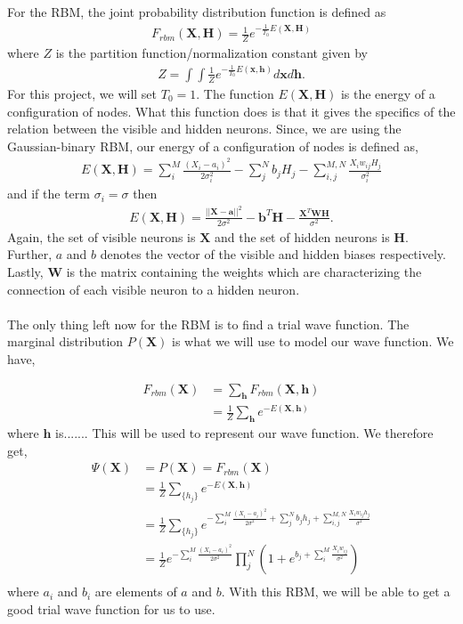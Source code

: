 For the RBM, the joint probability distribution function is defined as 
\begin{align*}
	F_{rbm}(\mathbf{X},\mathbf{H}) = \frac{1}{Z} e^{-\frac{1}{T_0}E(\mathbf{X},\mathbf{H})}
\end{align*}
where $Z$ is the partition function/normalization constant given by
\begin{align*}
	Z = \int \int \frac{1}{Z} e^{-\frac{1}{T_0}E(\mathbf{x},\mathbf{h})} d\mathbf{x} d\mathbf{h}.
\end{align*}
For this project, we will set $T_0 = 1$. The function $E(\mathbf{X},\mathbf{H})$ is the energy of a configuration of nodes. What this function does is that it gives the specifics of the relation between the visible and hidden neurons. Since, we are using the Gaussian-binary RBM, our energy of a configuration of nodes is defined as, 
\begin{align*}
	E(\mathbf{X}, \mathbf{H}) = \sum_i^M \frac{(X_i - a_i)^2}{2\sigma_i^2} - \sum_j^N b_j H_j - \sum_{i,j}^{M,N} \frac{X_i w_{ij} H_j}{\sigma_i^2} 
\end{align*}
and if the term $\sigma_i = \sigma$ then
\begin{align*}
	E(\mathbf{X}, \mathbf{H})= \frac{||\mathbf{X} - \mathbf{a}||^2}{2\sigma^2} - \mathbf{b}^T \mathbf{H} - \frac{\mathbf{X}^T \mathbf{W} \mathbf{H}}{\sigma^2}.
\end{align*}
Again, the set of visible neurons is $\mathbf{X}$ and the set of hidden neurons is $\mathbf{H}$. Further, $a$ and $b$ denotes the vector of the visible and hidden biases respectively. Lastly, $\mathbf{W}$ is the matrix containing the weights which are characterizing the connection of each visible neuron to a hidden neuron. \\\\
The only thing left now for the RBM is to find a trial wave function. The marginal distribution $P(\mathbf{X})$ is what we will use to model our wave function. We have,

\begin{align*}
	F_{rbm}(\mathbf{X}) &= \sum_\mathbf{h} F_{rbm}(\mathbf{X}, \mathbf{h}) \\
				&= \frac{1}{Z}\sum_\mathbf{h} e^{-E(\mathbf{X}, \mathbf{h})}
\end{align*}
where $\mathbf{h}$ is....... This will be used to represent our wave function. We therefore get, 
\begin{align*}
\Psi (\mathbf{X}) &= P(\mathbf{X}) =  F_{rbm}(\mathbf{X})\\
&= \frac{1}{Z}\sum_{\{h_j\}} e^{-E(\mathbf{X}, \mathbf{h})} \\
&= \frac{1}{Z} \sum_{\{h_j\}} e^{-\sum_i^M \frac{(X_i - a_i)^2}{2\sigma^2} + \sum_j^N b_j h_j + \sum_{i,j}^{M,N} \frac{X_i w_{ij} h_j}{\sigma^2}} \\
&= \frac{1}{Z} e^{-\sum_i^M \frac{(X_i - a_i)^2}{2\sigma^2}} \prod_j^N \left(1 + e^{b_j + \sum_i^M \frac{X_i w_{ij}}{\sigma^2}}\right) \\
\end{align*}
where $a_i$ and $b_i$ are elements of $a$ and $b$. With this RBM, we will be able to get a good trial wave function for us to use.

